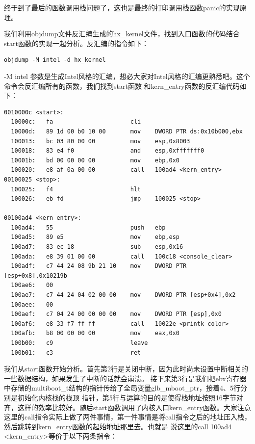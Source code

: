 \par 终于到了最后的函数调用栈问题了，这也是最终的打印调用栈函数panic的实现原理。

\par 我们利用objdump文件反汇编生成的hx\_kernel文件，找到入口函数的代码结合start函数的实现一起分析。反汇编的指令如下：

\begin{Verbatim}[frame=single]
  objdump -M intel -d hx_kernel
\end{Verbatim}

\par -M intel 参数是生成Intel风格的汇编，想必大家对Intel风格的汇编更熟悉吧。这个命令会反汇编所有的函数，我们找到start函数\allowbreak
和kern\_entry函数的反汇编代码如下：

\begin{lstlisting}[language = {[x86masm]Assembler}, caption = 入口函数反汇编]
0010000c <start>:
  10000c:	fa                   	cli    
  10000d:	89 1d 00 b0 10 00    	mov    DWORD PTR ds:0x10b000,ebx
  100013:	bc 03 80 00 00       	mov    esp,0x8003
  100018:	83 e4 f0             	and    esp,0xfffffff0
  10001b:	bd 00 00 00 00       	mov    ebp,0x0
  100020:	e8 af 0a 00 00       	call   100ad4 <kern_entry>
00100025 <stop>:
  100025:	f4                   	hlt    
  100026:	eb fd                	jmp    100025 <stop>

00100ad4 <kern_entry>:
  100ad4:	55                   	push   ebp
  100ad5:	89 e5                	mov    ebp,esp
  100ad7:	83 ec 18             	sub    esp,0x16
  100ada:	e8 39 01 00 00       	call   100c18 <console_clear>
  100adf:	c7 44 24 08 9b 21 10 	mov    DWORD PTR [esp+0x8],0x10219b
  100ae6:	00 
  100ae7:	c7 44 24 04 02 00 00 	mov    DWORD PTR [esp+0x4],0x2
  100aee:	00 
  100aef:	c7 04 24 00 00 00 00 	mov    DWORD PTR [esp],0x0
  100af6:	e8 33 f7 ff ff       	call   10022e <printk_color>
  100afb:	b8 00 00 00 00       	mov    eax,0x0
  100b00:	c9                   	leave  
  100b01:	c3                   	ret    
\end{lstlisting}

\par 我们从start函数开始分析。首先第2行是关闭中断，因为此时尚未设置中断相关的一些数据结构，如果发生了中断的话就会崩溃。\allowbreak
接下来第3行是我们把ebx寄存器中存储的multiboot\_t结构的指针传给了全局变量glb\_mboot\_ptr，接着4、5行分别是初始化内核栈的栈顶\allowbreak
指针，第5行与运算的目的是使得栈地址按照16字节对齐，这样的效率比较好。随后start函数调用了内核入口kern\_entry函数。大家注意\allowbreak
这里的call指令实际上做了两件事情，第一件事情是将call指令之后的地址压入栈，然后跳转到kern\_entry函数的起始地址那里去。也就是\allowbreak
说这里的call 100ad4 <kern\_entry>等价于以下两条指令：


